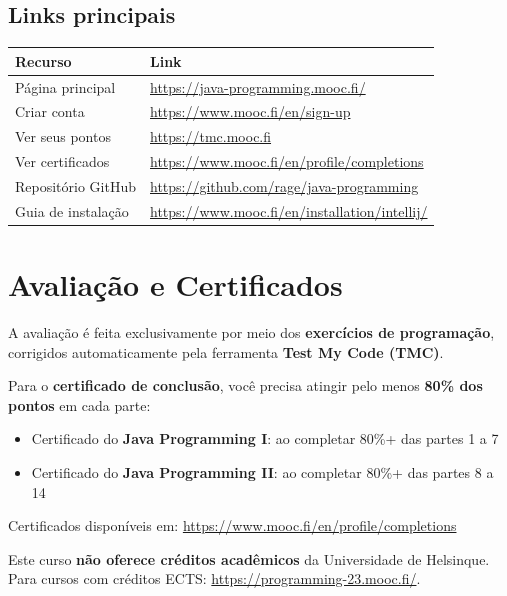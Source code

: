 \documentclass[11pt,a4paper]{article}
\begin{document}
\subsection{Links principais}

\begin{center}
\begin{tabular}{l l}
\toprule
\textbf{Recurso} & \textbf{Link} \\
\midrule
Página principal      & \url{https://java-programming.mooc.fi/} \\
Criar conta           & \url{https://www.mooc.fi/en/sign-up} \\
Ver seus pontos       & \url{https://tmc.mooc.fi} \\
Ver certificados      & \url{https://www.mooc.fi/en/profile/completions} \\
Repositório GitHub    & \url{https://github.com/rage/java-programming} \\
Guia de instalação    & \url{https://www.mooc.fi/en/installation/intellij/} \\
\bottomrule
\end{tabular}
\end{center}

\section{Avaliação e Certificados}

A avaliação é feita exclusivamente por meio dos \textbf{exercícios de programação}, corrigidos automaticamente pela ferramenta \textbf{Test My Code (TMC)}.

Para o \textbf{certificado de conclusão}, você precisa atingir pelo menos \textbf{80\% dos pontos} em cada parte:

\begin{itemize}
  \item Certificado do \textbf{Java Programming I}: ao completar 80\%+ das partes 1 a 7
  \item Certificado do \textbf{Java Programming II}: ao completar 80\%+ das partes 8 a 14
\end{itemize}

Certificados disponíveis em: \url{https://www.mooc.fi/en/profile/completions}

\begin{destaque}[Atenção]
Este curso \textbf{não oferece créditos acadêmicos} da Universidade de Helsinque. Para cursos com créditos ECTS: \url{https://programming-23.mooc.fi/}.
\end{destaque}
\end{document}
